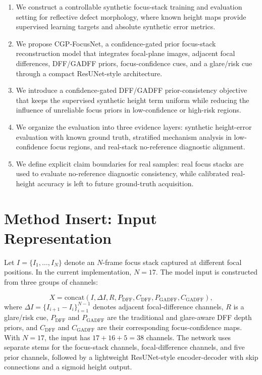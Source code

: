 \documentclass[11pt,a4paper]{article}
\newcommand{\method}{CGP-FocusNet}
\newcommand{\dff}{P_{\mathrm{DFF}}}
\newcommand{\gadff}{P_{\mathrm{GADFF}}}
\begin{document}
\begin{enumerate}
  \item We construct a controllable synthetic focus-stack training and evaluation setting for reflective defect morphology, where known height maps provide supervised learning targets and absolute synthetic error metrics.
  \item We propose \method, a confidence-gated prior focus-stack reconstruction model that integrates focal-plane images, adjacent focal differences, DFF/GADFF priors, focus-confidence cues, and a glare/risk cue through a compact ResUNet-style architecture.
  \item We introduce a confidence-gated DFF/GADFF prior-consistency objective that keeps the supervised synthetic height term uniform while reducing the influence of unreliable focus priors in low-confidence or high-risk regions.
  \item We organize the evaluation into three evidence layers: synthetic height-error evaluation with known ground truth, stratified mechanism analysis in low-confidence focus regions, and real-stack no-reference diagnostic alignment.
  \item We define explicit claim boundaries for real samples: real focus stacks are used to evaluate no-reference diagnostic consistency, while calibrated real-height accuracy is left to future ground-truth acquisition.
\end{enumerate}

\section*{Method Insert: Input Representation}

Let \(I=\{I_1,\ldots,I_N\}\) denote an \(N\)-frame focus stack captured at different focal positions. In the current implementation, \(N=17\). The model input is constructed from three groups of channels:

\begin{equation}
X = \mathrm{concat}\left(I,\Delta I, R,\dff,C_{\mathrm{DFF}},\gadff,C_{\mathrm{GADFF}}\right),
\end{equation}
where \(\Delta I=\{I_{i+1}-I_i\}_{i=1}^{N-1}\) denotes adjacent focal-difference channels, \(R\) is a glare/risk cue, \(\dff\) and \(\gadff\) are the traditional and glare-aware DFF depth priors, and \(C_{\mathrm{DFF}}\) and \(C_{\mathrm{GADFF}}\) are their corresponding focus-confidence maps. With \(N=17\), the input has \(17+16+5=38\) channels. The network uses separate stems for the focus-stack channels, focal-difference channels, and five prior channels, followed by a lightweight ResUNet-style encoder-decoder with skip connections and a sigmoid height output.
\end{document}
